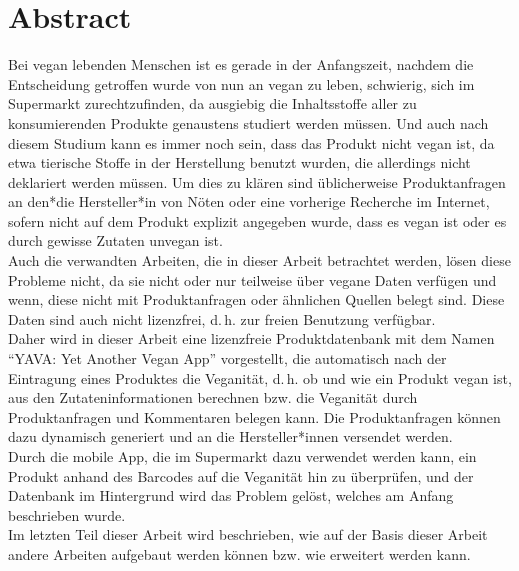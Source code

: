 \cleardoublepage\null

\vspace*{\fill}

\section*{\centering Abstract}

Bei vegan lebenden Menschen ist es gerade in der Anfangszeit, nachdem die Entscheidung getroffen
wurde von nun an vegan zu leben, schwierig, sich im Supermarkt 
zurechtzufinden, da ausgiebig die Inhaltsstoffe aller zu konsumierenden 
Produkte genaustens studiert werden müssen. Und auch nach diesem Studium kann 
es immer noch sein, dass das Produkt nicht vegan ist, da etwa tierische Stoffe 
in der Herstellung benutzt wurden, die allerdings nicht deklariert werden 
müssen.
Um dies zu klären sind üblicherweise Produktanfragen an den*die Hersteller*in 
von Nöten oder eine vorherige Recherche im Internet, sofern nicht auf dem 
Produkt explizit angegeben wurde, dass es vegan ist oder es durch gewisse 
Zutaten unvegan ist.\\
Auch die verwandten Arbeiten, die in dieser Arbeit betrachtet werden, lösen 
diese Probleme nicht, da sie nicht oder nur teilweise über vegane Daten verfügen und wenn, 
diese nicht mit Produktanfragen oder ähnlichen Quellen belegt sind. Diese Daten 
sind auch nicht lizenzfrei, d.\,h. zur freien Benutzung verfügbar.\\
Daher wird in dieser Arbeit eine lizenzfreie Produktdatenbank mit 
dem Namen "`YAVA: Yet Another Vegan App"' vorgestellt, die 
automatisch nach der Eintragung eines Produktes die Veganität, d.\,h. ob und 
wie ein Produkt vegan ist, aus den Zutateninformationen berechnen bzw. 
die Veganität durch Produktanfragen und Kommentaren belegen kann. Die 
Produktanfragen können dazu dynamisch generiert und an die 
Hersteller*innen versendet werden.\\
Durch die mobile App, die im Supermarkt dazu verwendet werden kann, ein Produkt 
anhand des Barcodes auf die Veganität hin zu überprüfen, und der Datenbank im 
Hintergrund wird das Problem gelöst, welches am Anfang beschrieben wurde.\\
Im letzten Teil dieser Arbeit wird beschrieben, wie auf der Basis dieser 
Arbeit andere Arbeiten aufgebaut werden können bzw. wie \name erweitert werden 
kann.

\vspace*{\fill}
